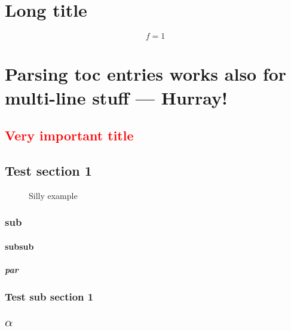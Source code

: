 
\chapter[Short title]{Long title}
\begin{equation}
  \label{eq:test}
  f=1
\end{equation}

\chapter{Parsing {toc entries works
  also for} multi-line \texorpdfstring{stuff}{entries}
--- Hurray!}

\section{\texorpdfstring{\textcolor{red}{Very important title}} {Very important title}}
\label{sec:test2}

\section{Test section 1}\label{sec:TesSec1}


\begin{figure}[htpb]
  \centering
  
  \caption{Silly example}
  \label{fig:example1}
\end{figure}

\subsection{sub}

\subsubsection{subsub}

\paragraph{par}

\subsection{Test sub section 1}

\section{$\alpha$}

